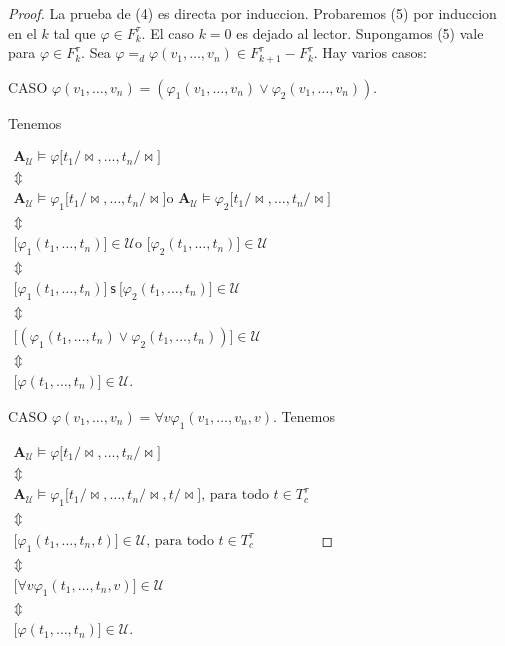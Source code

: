 \begin{proof}
    La prueba de (4) es directa por induccion. Probaremos (5) por induccion en el $k$ tal que $\varphi \in F_{k}^{\tau }$. El caso $k=0$ es dejado al lector. Supongamos (5) vale para $\varphi \in F_{k}^{\tau }$. Sea $\varphi =_{d}\varphi (v_{1}, \dotsc, v_{n}) \in F_{k+1}^{\tau }-F_{k}^{\tau }.$ Hay varios casos:

    CASO $\varphi (v_{1}, \dotsc, v_{n})=\left( \varphi_{1}(v_{1}, \dotsc, v_{n}) \vee \varphi_{2}(v_{1}, \dotsc, v_{n})\right) .$

    Tenemos

    $\displaystyle \begin{array}{c} \mathbf{A}_{\mathcal{U}}\models \varphi \lbrack t_{1}/\mathrm{\bowtie } , \dotsc, t_{n}/\mathrm{\bowtie }\rbrack \\ \Updownarrow \\ \mathbf{A}_{\mathcal{U}}\models \varphi_{1}\lbrack t_{1}/\mathrm{\bowtie } , \dotsc, t_{n}/\mathrm{\bowtie }\rbrack\text{o }\mathbf{A}_{\mathcal{U}}\models \varphi_{2}\lbrack t_{1}/\mathrm{\bowtie }, \dotsc, t_{n}/\mathrm{\bowtie }\rbrack \\ \Updownarrow \\ \lbrack \varphi_{1}(t_{1}, \dotsc, t_{n})\rbrack\in \mathcal{U}\text{o }\lbrack\varphi_{2}(t_{1}, \dotsc, t_{n})\rbrack\in \mathcal{U} \\ \Updownarrow \\ \lbrack \varphi_{1}(t_{1}, \dotsc, t_{n})\rbrack\ \mathsf{s\ }\lbrack\varphi_{2}(t_{1}, \dotsc, t_{n})\rbrack\in \mathcal{U} \\ \Updownarrow \\ \lbrack \left( \varphi_{1}(t_{1}, \dotsc, t_{n}) \vee \varphi_{2}(t_{1}, \dotsc, t_{n})\right) \rbrack\in \mathcal{U} \\ \Updownarrow \\ \lbrack \varphi (t_{1}, \dotsc, t_{n})\rbrack\in \mathcal{U}. \end{array} $

    CASO $\varphi (v_{1}, \dotsc, v_{n})=\forall v\varphi_{1}(v_{1}, \dotsc, v_{n},v).$
    Tenemos

    $\displaystyle \begin{array}{c} \mathbf{A}_{\mathcal{U}}\models \varphi \lbrack t_{1}/\mathrm{\bowtie } , \dotsc, t_{n}/\mathrm{\bowtie }\rbrack \\ \Updownarrow \\ \mathbf{A}_{\mathcal{U}}\models \varphi_{1}\lbrack t_{1}/\mathrm{\bowtie } , \dotsc, t_{n}/\mathrm{\bowtie },t/\mathrm{\bowtie }\rbrack\text{, para todo }t\in T_{c}^{\tau } \\ \Updownarrow \\ \lbrack \varphi_{1}(t_{1}, \dotsc, t_{n},t)\rbrack\in \mathcal{U}\text{, para todo } t\in T_{c}^{\tau } \\ \Updownarrow \\ \lbrack \forall v\varphi_{1}(t_{1}, \dotsc, t_{n},v)\rbrack\in \mathcal{U} \\ \Updownarrow \\ \lbrack \varphi (t_{1}, \dotsc, t_{n})\rbrack\in \mathcal{U}. \end{array} $


\end{proof}
